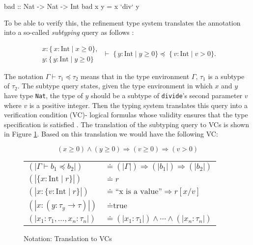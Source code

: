 \documentclass[]{rptuseminar}
\begin{document}
\begin{haskell}  
bad :: Nat -> Nat -> Int 
bad x y = x `div` y
\end{haskell} 
To be able to verify this, the refinement type system translates the annotation into a so-called
\textit{subtyping} query as follows \cite{vazou_refinement_2014}:

\begin{equation*}
\label{eq:subtyping}
\begin{matrix}
x : \{\,x : \mathrm{Int} \mid x \ge 0\}, \\

y : \{\,y : \mathrm{Int} \mid y \ge 0\}
\end{matrix}
\;\vdash\;
\{\,y : \mathrm{Int} \mid y \ge 0\}
\preceq
\;\{\,v : \mathrm{Int} \mid v > 0\}.
\end{equation*}

The notation $\Gamma  \vdash \tau_1 \preceq \tau_2$ means that in the type environment $\Gamma$, 
$\tau_1$ is a subtype of $\tau_2$. The subtype query states, given the type environment in which 
$x$ and $y$ have type \texttt{Nat}, the type of $y$ should be a subtype of \texttt{divide}'s second parameter $v$ where $v$ is a positive integer.
Then the typing system translates this query into a verification condition (VC)- logical formulas whose validity ensures that the type
specification is satisfied \cite{vazou_refinement_2014}.
The translation of the subtyping query to VCs is shown in Figure \ref{fig:notation}. Based on this
translation we would have the following VC:

\begin{equation}
\label{eq:subtyping-vc}
(x \ge 0) \land (y \ge 0)  \Rightarrow (v \ge 0) \Rightarrow (v > 0)
\end{equation}
\begin{figure}[htbp]
  \centering
  \renewcommand{\arraystretch}{1.4}
  \begin{tabular}{@{}ll@{}}
    \( (|\Gamma \vdash b_1 \preceq b_2|) \) & \( \doteq (|\Gamma|) \Rightarrow (|b_1|) \Rightarrow (|b_2|) \) \\[1ex]
    \( (|\{x:\mathrm{Int} \mid r\}|) \) & \( \doteq r \) \\[1ex]
    \( (|x:\{v:\mathrm{Int} \mid r\}|) \) & \( \doteq \text{``x is a value''} \Rightarrow r[x/v] \) \\[1ex]
    \( (|x:(y:\tau_y \to \tau)|) \) & \( \doteq \text{true} \) \\[1ex]
    \( (|x_1:\tau_1,\ldots,x_n:\tau_n|) \) & \( \doteq (|x_1:\tau_1|) \land \cdots \land (|x_n:\tau_n|) \)
  \end{tabular}
  \caption{Notation: Translation to VCs \cite{vazou_refinement_2014}}
  \label{fig:notation}
\end{figure}
\end{document}
